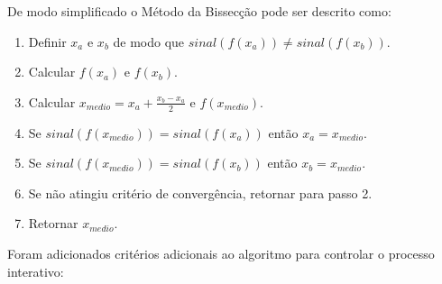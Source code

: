 \documentclass[final,3p,12pt]{elsarticle}
\begin{document}
    De modo simplificado o Método da Bissecção pode ser descrito como:
    
    \begin{enumerate}
        \item Definir $x_a$ e $x_b$ de modo que $sinal(f(x_a)) \neq sinal(f(x_b))$.
        \item Calcular $f(x_a)$ e $f(x_b)$.
        \item Calcular $x_{medio} = x_a + \frac{x_b - x_a}{2}$ e $f(x_{medio})$.
        \item Se $sinal(f(x_{medio})) = sinal(f(x_a))$ então $x_a = x_{medio}$.
        \item Se $sinal(f(x_{medio})) = sinal(f(x_b))$ então $x_b = x_{medio}$.
        \item Se não atingiu critério de convergência, retornar para passo 2.
        \item Retornar $x_{medio}$.
    \end{enumerate}
    
    Foram adicionados critérios adicionais ao algoritmo para controlar o processo interativo:
\end{document}
